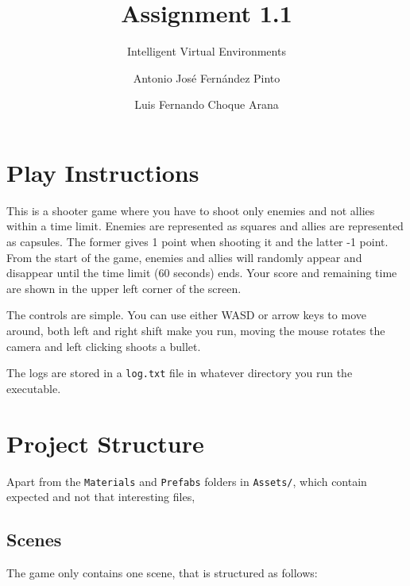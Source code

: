 \documentclass[
	emulatestandardclasses, %
	11pt,
	a4paper,
	toc=bib, %
	parskip=half-,
	numbers=endperiod,
]{scrartcl}
\title{Assignment 1.1}
\subtitle{Intelligent Virtual Environments}
\author{Antonio José Fernández Pinto \and Luis Fernando Choque Arana}
\date{} %
\begin{document}
\maketitle[0]

\vspace{-1cm}

\section{Play Instructions}

This is a shooter game where you have to shoot only enemies and not allies within a time limit. Enemies are represented as squares and allies are represented as capsules. The former gives 1 point when shooting it and the latter -1 point. From the start of the game, enemies and allies will randomly appear and disappear until the time limit (60 seconds) ends. Your score and remaining time are shown in the upper left corner of the screen.

The controls are simple. You can use either WASD or arrow keys to move around, both left and right shift make you run, moving the mouse rotates the camera and left clicking shoots a bullet.

The logs are stored in a \texttt{log.txt} file in whatever directory you run the executable.

\section{Project Structure}

Apart from the \texttt{Materials} and \texttt{Prefabs} folders in \texttt{Assets/}, which contain expected and not that interesting files, 

\subsection{Scenes}

The game only contains one scene, that is structured as follows:
\end{document}
